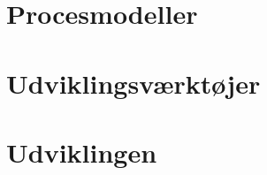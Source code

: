 \chapter{Procesmodeller}\label{ch:procesmodeller}



\chapter{Udviklingsværktøjer}\label{ch:udviklingsvaerktoejer}



\chapter{Udviklingen}\label{ch:udviklingen}

